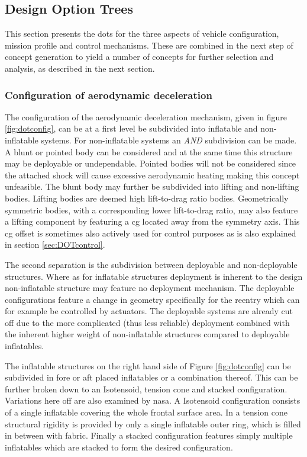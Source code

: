 \subsection{Design Option Trees}
This section presents the \gls{dot}s for the three aspects of vehicle configuration, mission profile and control mechanisms. These are combined in the next step of concept generation to yield a number of concepts for further selection and analysis, as described in the next section.
\subsubsection{Configuration of aerodynamic deceleration}
The configuration of the aerodynamic deceleration mechanism, given in figure \ref{fig:dotconfig}, can be at a first level be subdivided into inflatable and non-inflatable systems. For non-inflatable systems an \textit{AND} subdivision can be made. A blunt or pointed body can be considered and at the same time this structure may be deployable or undependable. Pointed bodies will not be considered since the attached shock will cause excessive aerodynamic heating \cite{AndersonJr.2007} making this concept unfeasible. The blunt body may further be subdivided into lifting and non-lifting bodies. Lifting bodies are deemed high lift-to-drag ratio bodies. Geometrically symmetric bodies, with a corresponding lower lift-to-drag ratio, may also feature a lifting component by featuring a \gls{cg} located away from the symmetry axis. This \gls{cg} offset is sometimes also actively used for control purposes\cite{Dillman2012} as is also explained in section \ref{sec:DOTcontrol}. 

The second separation is  the subdivision between deployable and non-deployable structures. Where as for inflatable structures deployment is inherent to the design non-inflatable structure may feature no deployment mechanism. The deployable configurations feature a change in geometry specifically for the reentry which can for example be controlled by actuators. The deployable systems are already cut off due to the more complicated (thus less reliable) deployment combined with the inherent higher weight of non-inflatable structures \cite{Cianciolo2010} compared to deployable inflatables.

The inflatable structures on the right hand side of Figure \ref{fig:dotconfig} can be subdivided in fore or aft placed inflatables or a combination thereof. This can be further broken down to an Isotensoid, tension cone and stacked configuration. Variations here off are also examined by \gls{nasa}\cite{Smith2010}. A Isotensoid configuration consists of a single inflatable covering the whole frontal surface area. In a tension cone structural rigidity is provided by only a single inflatable outer ring, which is filled in between with fabric. Finally a stacked configuration features simply multiple inflatables which are stacked to form the desired configuration.


